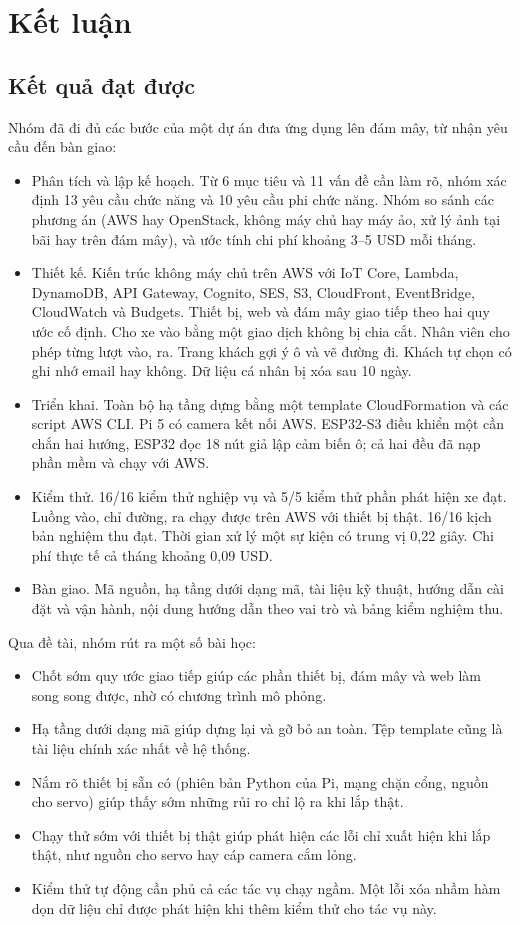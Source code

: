 \chapter{Kết luận}

\section{Kết quả đạt được}

Nhóm đã đi đủ các bước của một dự án đưa ứng dụng lên đám mây, từ nhận yêu cầu đến bàn giao:

\begin{itemize}
  \item Phân tích và lập kế hoạch. Từ 6 mục tiêu và 11 vấn đề cần làm rõ, nhóm xác định 13 yêu cầu chức năng và 10 yêu cầu phi chức năng. Nhóm so sánh các phương án (AWS hay OpenStack, không máy chủ hay máy ảo, xử lý ảnh tại bãi hay trên đám mây), và ước tính chi phí khoảng 3--5 USD mỗi tháng.
  \item Thiết kế. Kiến trúc không máy chủ trên AWS với IoT Core, Lambda, DynamoDB, API Gateway, Cognito, SES, S3, CloudFront, EventBridge, CloudWatch và Budgets. Thiết bị, web và đám mây giao tiếp theo hai quy ước cố định. Cho xe vào bằng một giao dịch không bị chia cắt. Nhân viên cho phép từng lượt vào, ra. Trang khách gợi ý ô và vẽ đường đi. Khách tự chọn có ghi nhớ email hay không. Dữ liệu cá nhân bị xóa sau 10 ngày.
  \item Triển khai. Toàn bộ hạ tầng dựng bằng một template CloudFormation và các script AWS CLI. Pi 5 có camera kết nối AWS. ESP32-S3 điều khiển một cần chắn hai hướng, ESP32 đọc 18 nút giả lập cảm biến ô; cả hai đều đã nạp phần mềm và chạy với AWS.
  \item Kiểm thử. 16/16 kiểm thử nghiệp vụ và 5/5 kiểm thử phần phát hiện xe đạt. Luồng vào, chỉ đường, ra chạy được trên AWS với thiết bị thật. 16/16 kịch bản nghiệm thu đạt. Thời gian xử lý một sự kiện có trung vị 0,22 giây. Chi phí thực tế cả tháng khoảng 0,09 USD.
  \item Bàn giao. Mã nguồn, hạ tầng dưới dạng mã, tài liệu kỹ thuật, hướng dẫn cài đặt và vận hành, nội dung hướng dẫn theo vai trò và bảng kiểm nghiệm thu.
\end{itemize}

Qua đề tài, nhóm rút ra một số bài học:
\begin{itemize}
  \item Chốt sớm quy ước giao tiếp giúp các phần thiết bị, đám mây và web làm song song được, nhờ có chương trình mô phỏng.
  \item Hạ tầng dưới dạng mã giúp dựng lại và gỡ bỏ an toàn. Tệp template cũng là tài liệu chính xác nhất về hệ thống.
  \item Nắm rõ thiết bị sẵn có (phiên bản Python của Pi, mạng chặn cổng, nguồn cho servo) giúp thấy sớm những rủi ro chỉ lộ ra khi lắp thật.
  \item Chạy thử sớm với thiết bị thật giúp phát hiện các lỗi chỉ xuất hiện khi lắp thật, như nguồn cho servo hay cáp camera cắm lỏng.
  \item Kiểm thử tự động cần phủ cả các tác vụ chạy ngầm. Một lỗi xóa nhầm hàm dọn dữ liệu chỉ được phát hiện khi thêm kiểm thử cho tác vụ này.
\end{itemize}
